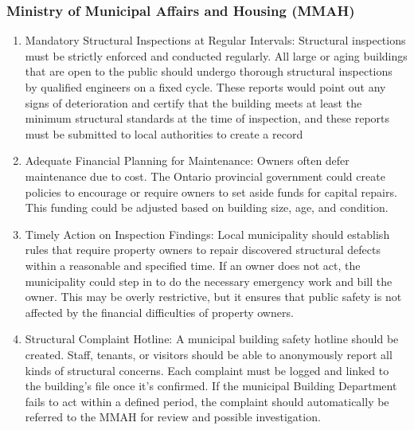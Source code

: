 \documentclass[12pt]{article}
\begin{document}
\subsubsection{Ministry of Municipal Affairs and Housing (MMAH)}
\begin{enumerate}
    \item Mandatory Structural Inspections at Regular Intervals: Structural inspections must be strictly enforced and conducted regularly. All large or aging buildings that are open to the public should undergo thorough structural inspections by qualified engineers on a fixed cycle. These reports would point out any signs of deterioration and certify that the building meets at least the minimum structural standards at the time of inspection, and these reports must be submitted to local authorities to create a record

    \item Adequate Financial Planning for Maintenance: Owners often defer maintenance due to cost. The Ontario provincial government could create policies to encourage or require owners to set aside funds for capital repairs. This funding could be adjusted based on building size, age, and condition. 

    \item Timely Action on Inspection Findings: Local municipality should establish rules that require property owners to repair discovered structural defects within a reasonable and specified time. If an owner does not act, the municipality could step in to do the necessary emergency work and bill the owner. This may be overly restrictive, but it ensures that public safety is not affected by the financial difficulties of property owners.
    
    \item Structural Complaint Hotline: A municipal building safety hotline should be created. Staff, tenants, or visitors should be able to anonymously report all kinds of structural concerns. Each complaint must be logged and linked to the building’s file once it's confirmed. If the municipal Building Department fails to act within a defined period, the complaint should automatically be referred to the MMAH for review and possible investigation.
\end{enumerate}
\end{document}
